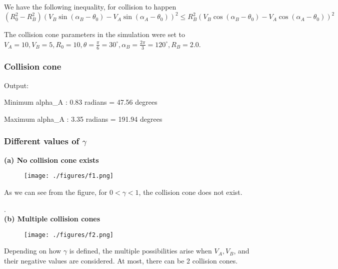 We have the following inequality, for collision to happen
\begin{equation*}
      \boxed{ (R_0^2 - R_B^2) {(V_B \sin (\alpha_B - \theta_0) - V_A \sin (\alpha_A - \theta_0))}^2 \leq R_B^2 {(V_B \cos (\alpha_B - \theta_0) - V_A \cos (\alpha_A - \theta_0))}^2 }
\end{equation*}

\clearpage
The collision cone parameters in the simulation were set to \( V_A = 10, V_B = 5, R_0 = 10, \theta = \frac{\pi}{6} = 30^\circ, \alpha_B = \frac{2\pi}{3} = 120^\circ, R_B = 2.0 \).

\vspace*{-1em}
\subsubsection*{Collision cone}

Output:

Minimum alpha\_A : 0.83 radians = 47.56 degrees

Maximum alpha\_A : 3.35 radians = 191.94 degrees

\vspace*{-1em}
\subsubsection*{Different values of \( \gamma \)}

\textbf{(a) No collision cone exists}

\vspace*{-2em}
\begin{figure}[htbp]
      \centering
      \texttt{[image: ./figures/f1.png]}
\end{figure}

\vspace*{-1.5em}
As we can see from the figure, for \( 0 < \gamma < 1 \), the collision cone does not exist.

. \\
\textbf{(b) Multiple collision cones}

\vspace*{-1em}
\begin{figure}[htbp]
      \centering
      \texttt{[image: ./figures/f2.png]}
\end{figure}

\vspace*{-1.5em}
Depending on how \( \gamma \) is defined, the multiple possibilities arise when \( V_A,  V_B \), and their negative values are considered.
At most, there can be 2 collision cones.


